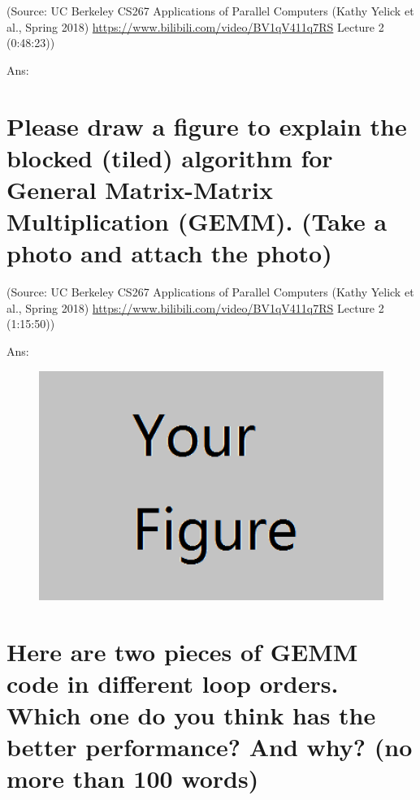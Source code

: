 \documentclass[UTF8]{article}
\begin{document}
(Source: UC Berkeley CS267 Applications of Parallel Computers (Kathy Yelick et al., Spring 2018) \url{https://www.bilibili.com/video/BV1qV411q7RS} Lecture 2 (0:48:23))

Ans:%
~\\
\section{Please draw a figure to explain the blocked (tiled) algorithm for General Matrix-Matrix Multiplication (GEMM). (Take a photo and attach the photo)}
(Source: UC Berkeley CS267 Applications of Parallel Computers (Kathy Yelick et al., Spring 2018) \url{https://www.bilibili.com/video/BV1qV411q7RS} Lecture 2 (1:15:50))

Ans:%
\begin{figure}[ht]
\centering
\includegraphics[width=5in]{example.png}
\end{figure}


\section{Here are two pieces of GEMM code in different loop orders. Which one do you think has the better performance? And why? (no more than 100 words)}
\begin{figure}[htbp]
\centering
{}
\end{figure}
\end{document}
